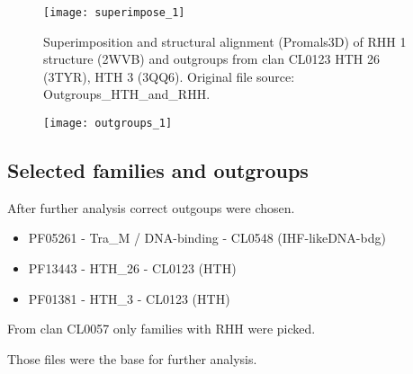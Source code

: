 \begin{figure}[H]
\texttt{[image: superimpose\_1]}
\caption{Superimposition and structural alignment (Promals3D) of RHH 1 structure (2WVB) and outgroups from clan CL0123
HTH 26 (3TYR), HTH 3 (3QQ6). Original file source: Outgroups\_HTH\_and\_RHH.}
\end{figure}

\begin{figure}[H]
\texttt{[image: outgroups\_1]}
\end{figure}

        \subsection{Selected families and outgroups}
After further analysis correct outgoups were chosen.
    \begin{itemize}
        \item PF05261 - Tra\_M / DNA-binding - CL0548 (IHF-likeDNA-bdg)
        \item PF13443 - HTH\_26 - CL0123 (HTH)
        \item PF01381 - HTH\_3 - CL0123 (HTH)
    \end{itemize}

From clan CL0057 only families with RHH were picked.

Those files were the base for further analysis.

        




